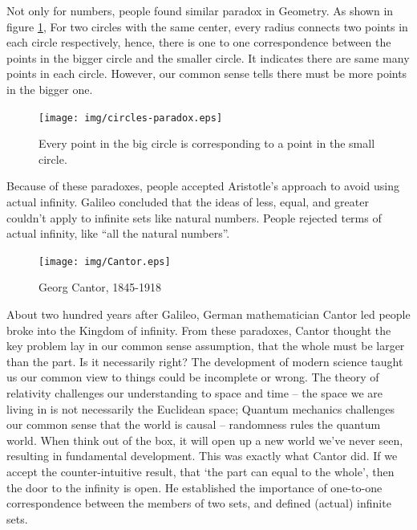 \documentclass{article}
\begin{document}
Not only for numbers, people found similar paradox in Geometry. As shown in figure \ref{fig:circles-paradox}, For two circles with the same center, every radius connects two points in each circle respectively, hence, there is one to one correspondence between the points in the bigger circle and the smaller circle. It indicates there are same many points in each circle. However, our common sense tells there must be more points in the bigger one.

\begin{figure}[htbp]
 \centering
 \texttt{[image: img/circles-paradox.eps]}
 \caption{Every point in the big circle is corresponding to a point in the small circle.}
 \label{fig:circles-paradox}
\end{figure}

Because of these paradoxes, people accepted Aristotle's approach to avoid using actual infinity. Galileo concluded that the ideas of less, equal, and greater couldn't apply to infinite sets like natural numbers. People rejected terms of actual infinity, like ``all the natural numbers''.

\begin{figure}
 \centering
 \texttt{[image: img/Cantor.eps]}
 \captionsetup{labelformat=empty}
 \caption{Georg Cantor, 1845-1918}
 \label{fig:Cantor}
\end{figure}

About two hundred years after Galileo, German mathematician Cantor led people broke into the Kingdom of infinity. From these paradoxes, Cantor thought the key problem lay in our common sense assumption, that the whole must be larger than the part. Is it necessarily right? The development of modern science taught us our common view to things could be incomplete or wrong. The theory of relativity challenges our understanding to space and time -- the space we are living in is not necessarily the Euclidean space; Quantum mechanics challenges our common sense that the world is causal -- randomness rules the quantum world. When think out of the box, it will open up a new world we've never seen, resulting in fundamental development. This was exactly what Cantor did. If we accept the counter-intuitive result, that `the part can equal to the whole', then the door to the infinity is open. He established the importance of one-to-one correspondence between the members of two sets, and defined (actual) infinite sets.
\end{document}
